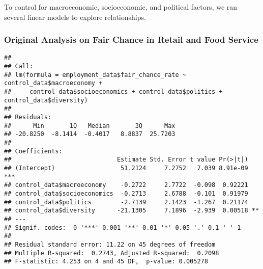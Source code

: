 \documentclass[
]{article}
\newenvironment{Shaded}{\begin{snugshade}}{\end{snugshade}}
\newcommand{\CommentTok}[1]{\textcolor[rgb]{0.56,0.35,0.01}{\textit{#1}}}
\newcommand{\FunctionTok}[1]{\textcolor[rgb]{0.13,0.29,0.53}{\textbf{#1}}}
\newcommand{\NormalTok}[1]{#1}
\newcommand{\OtherTok}[1]{\textcolor[rgb]{0.56,0.35,0.01}{#1}}
\newcommand{\SpecialCharTok}[1]{\textcolor[rgb]{0.81,0.36,0.00}{\textbf{#1}}}
\begin{document}
To control for macroeconomic, socioeconomic, and political factors, we
ran several linear models to explore relationships.

\subsubsection{Original Analysis on Fair Chance in Retail and Food
Service}\label{original-analysis-on-fair-chance-in-retail-and-food-service}

\begin{Shaded}
\end{Shaded}

\begin{verbatim}
## 
## Call:
## lm(formula = employment_data$fair_chance_rate ~ control_data$macroeconomy + 
##     control_data$socioeconomics + control_data$politics + control_data$diversity)
## 
## Residuals:
##      Min       1Q   Median       3Q      Max 
## -20.8250  -8.1414  -0.4017   8.8837  25.7203 
## 
## Coefficients:
##                             Estimate Std. Error t value Pr(>|t|)    
## (Intercept)                  51.2124     7.2752   7.039 8.91e-09 ***
## control_data$macroeconomy    -0.2722     2.7722  -0.098  0.92221    
## control_data$socioeconomics  -0.2713     2.6788  -0.101  0.91979    
## control_data$politics        -2.7139     2.1423  -1.267  0.21174    
## control_data$diversity      -21.1305     7.1896  -2.939  0.00518 ** 
## ---
## Signif. codes:  0 '***' 0.001 '**' 0.01 '*' 0.05 '.' 0.1 ' ' 1
## 
## Residual standard error: 11.22 on 45 degrees of freedom
## Multiple R-squared:  0.2743, Adjusted R-squared:  0.2098 
## F-statistic: 4.253 on 4 and 45 DF,  p-value: 0.005278
\end{verbatim}
\end{document}

